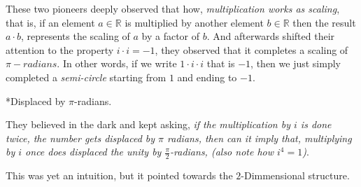 These two pioneers deeply observed that how, \emph{multiplication works as scaling}, that is, if an element $a \in \mathbb{R}$ is multiplied by another element $b \in \mathbb{R}$ then the result $a \cdot b$, represents the scaling of $a$ by a factor of $b$.
And afterwards shifted their attention to the property $i\cdot i = -1$, they observed that it completes a scaling of $\pi-radians$. In other words, if we write $1 \cdot i \cdot i$ that is $-1$, then we just simply completed a \emph{semi-circle} starting from $1$ and ending to $-1$. 

\begin{center} 
*Displaced by $\pi$-radians.
\end{center}

They believed in the dark and kept asking, \emph{if the multiplication by $i$ is done twice, the number gets displaced by $\pi$ radians, then can it imply that, multiplying by $i$ once does displaced the unity by $\frac{\pi}{2}$-radians, (also note how $i^4 = 1$)}.

This was yet an intuition, but it pointed towards the $2$-Dimmensional structure.

\begin{center}
\end{center}

